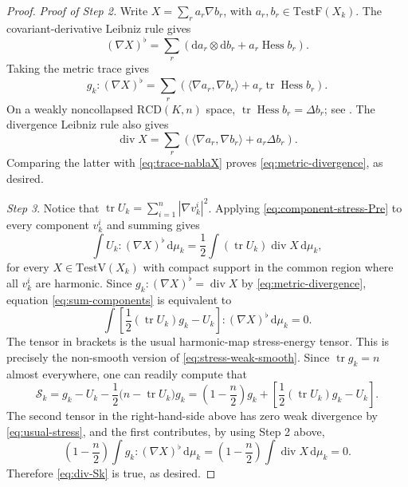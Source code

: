 \documentclass[12pt,a4paper,reqno]{amsart}
\newcommand{\TestF}{\mathrm{TestF}}
\newcommand{\TestV}{\mathrm{TestV}}
\newcommand{\Hess}{\operatorname{Hess}}
\newcommand{\tr}{\operatorname{tr}}
\begin{document}
\begin{proof}
\textit{Proof of Step 2.}
Write $
 X=\sum_r a_r\nabla b_r$, with $a_r,b_r\in\TestF(X_k)$.
The covariant-derivative Leibniz rule
\cite[Theorem~3.4.2(v)]{GigliNDG} gives
\[
 (\nabla X)^{\flat}
 =\sum_r\left(\mathrm{d}a_r\otimes \mathrm{d}b_r+a_r\Hess b_r\right).
\]
Taking the metric trace gives
\begin{equation}\label{eq:trace-nablaX}
 g_k:(\nabla X)^{\flat}
 =\sum_r\left(
 \langle\nabla a_r,\nabla b_r\rangle
 +a_r\tr\Hess b_r\right).
\end{equation}
On a weakly noncollapsed $\mathrm{RCD}(K,n)$ space,
$
 \tr\Hess b_r=\Delta b_r
$; see \cite[Theorem~1.12 and (1.10)]{DePhilippisGigli}.  The divergence
Leibniz rule \cite[Proposition~4.2(2)]{GigliViolo} also gives
\[
 \operatorname{div}X
 =\sum_r\left(
 \langle\nabla a_r,\nabla b_r\rangle+a_r\Delta b_r\right).
\]
Comparing the latter with \eqref{eq:trace-nablaX} proves
\eqref{eq:metric-divergence}, as desired.
\medskip

\textit{Step 3}. Notice that
$
 \tr U_k=\sum_{i=1}^n|\nabla v_k^i|^2$. 
Applying \eqref{eq:component-stress-Pre} to every component $v_k^i$ and
summing gives
\begin{equation}\label{eq:sum-components}
 \int U_k:(\nabla X)^{\flat}\,\mathrm{d}\mu_k
 =\frac12\int(\tr U_k)\operatorname{div}X\,\mathrm{d}\mu_k,
\end{equation}
for every $X\in \TestV(X_k)$ with compact support in the common region where all $v_k^i$ are harmonic.
Since $g_k:(\nabla X)^{\flat}=\operatorname{div}X$ by \eqref{eq:metric-divergence}, equation
\eqref{eq:sum-components} is equivalent to
\begin{equation}\label{eq:usual-stress}
 \int\left[\frac12(\tr U_k)g_k-U_k\right]:(\nabla X)^{\flat}\,\mathrm{d}\mu_k=0.
\end{equation}
The tensor in brackets is the usual harmonic-map stress-energy tensor. This is precisely the non-smooth version of \eqref{eq:stress-weak-smooth}. Since $\tr g_k=n$ almost everywhere, one can readily compute that 
\[
 \mathcal S_k
 =g_k-U_k-\frac12\bigl(n-\tr U_k\bigr)g_k=\left(1-\frac n2\right)g_k
   +\left[\frac12(\tr U_k)g_k-U_k\right].
\]
The second tensor in the right-hand-side above has zero weak divergence by
\eqref{eq:usual-stress}, and the first contributes, by using Step 2 above,
\[
 \left(1-\frac n2\right)
 \int g_k:(\nabla X)^{\flat}\,\mathrm{d}\mu_k
 =\left(1-\frac n2\right)
 \int\operatorname{div}X\,\mathrm{d}\mu_k=0.
\]
Therefore \eqref{eq:div-Sk} is true, as desired.
\end{proof}
\end{document}
